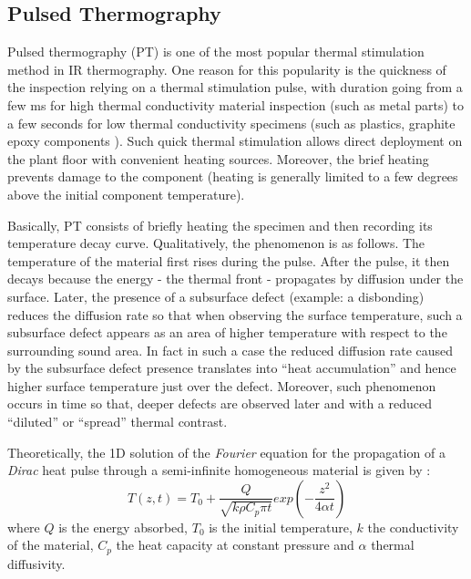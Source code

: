 \subsection{Pulsed Thermography}

Pulsed thermography (PT) is one of the most popular thermal stimulation method in IR thermography. One reason for this popularity is the quickness of the inspection relying on a thermal stimulation pulse, with duration going from a few ms for high thermal conductivity material inspection (such as metal parts) to a few seconds for low thermal conductivity specimens (such as plastics, graphite epoxy components \citep{Maldague1993Nondestructive,Maldague1994bInfra}). Such quick thermal stimulation allows direct deployment on the plant floor with convenient heating sources. Moreover, the brief heating prevents damage to the component (heating is generally limited to a few degrees above the initial component temperature).

Basically, PT consists of briefly heating the specimen and then recording its temperature decay curve. Qualitatively, the phenomenon is as follows. The temperature of the material first rises during the pulse. After the pulse, it then decays because the energy - the thermal front - propagates by diffusion under the surface. Later, the presence of a subsurface defect (example: a disbonding) reduces the diffusion rate so that when observing the surface temperature, such a subsurface defect appears as an area of higher temperature with respect to the surrounding sound area. In fact in such a case the reduced diffusion rate caused by the subsurface defect presence translates into “heat accumulation” and hence higher surface temperature just over the defect. Moreover, such phenomenon occurs in time so that, deeper defects are observed later and with a reduced “diluted” or “spread” thermal contrast.

Theoretically, the 1D solution of the \textit{Fourier} equation for the propagation of a \textit{Dirac} heat pulse through a semi-infinite homogeneous material is given by \citep{carslaw1986heat}:
\begin{equation}
T(z,t) = T_0 + \frac{Q}{\sqrt{k\rho C_p \pi t}}exp(-\frac{z^2}{4\alpha t})
\end{equation}
where $Q$ is the energy absorbed, $T_0$  is the initial temperature, $k$ the conductivity of the material, $C_p$ the heat capacity at constant pressure and $\alpha$ thermal diffusivity.

